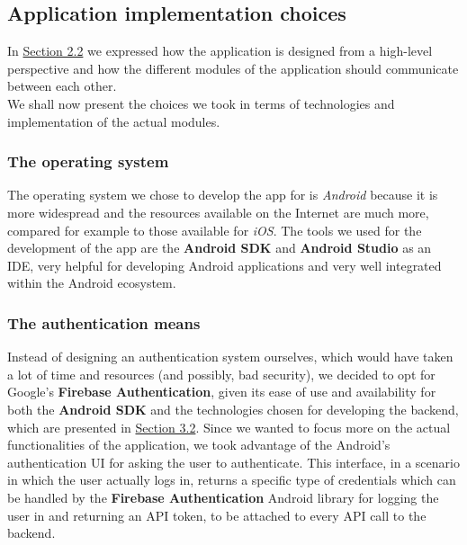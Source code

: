 \documentclass[../../main]{subfiles}
\begin{document}
\subsection{Application implementation choices}
\label{ss:application-implementation-choices}

In \hyperref[ss:application-architecture]{Section 2.2} we expressed how the application is designed from a high-level perspective and how the different modules of the application should communicate between each other.\\
We shall now present the choices we took in terms of technologies and implementation of the actual modules.

\subsubsection{The operating system}
The operating system we chose to develop the app for is \textit{Android} because it is more widespread and the resources available on the Internet are much more, compared for example to those available for \textit{iOS}.
The tools we used for the development of the app are the \textbf{Android SDK} and \textbf{Android Studio} as an IDE, very helpful for developing Android applications and very well integrated within the Android ecosystem.

\subsubsection{The authentication means}
Instead of designing an authentication system ourselves, which would have taken a lot of time and resources (and possibly, bad security), we decided to opt for Google's \textbf{Firebase Authentication}, given its ease of use and availability for both the \textbf{Android SDK} and the technologies chosen for developing the backend, which are presented in \hyperref[ss:server-implementation-choices]{Section 3.2}.
Since we wanted to focus more on the actual functionalities of the application, we took advantage of the Android's authentication UI for asking the user to authenticate.
This interface, in a scenario in which the user actually logs in, returns a specific type of credentials which can be handled by the \textbf{Firebase Authentication} Android library for logging the user in and returning an API token, to be attached to every API call to the backend.
\end{document}
